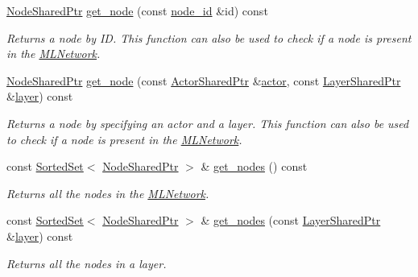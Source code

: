 \begin{DoxyCompactItemize}
\hyperlink{namespacemlnet_acf8b1b6deb52e7dacfc676c689f9a10c}{Node\+Shared\+Ptr} \hyperlink{classmlnet_1_1_m_l_network_abc3494cf0f75b871a619cee338bdf86f}{get\+\_\+node} (const \hyperlink{namespacemlnet_a4c354f08ca868982bf3ddae882ff71c6}{node\+\_\+id} \&id) const 
\begin{DoxyCompactList}\small\item\em Returns a node by I\+D. This function can also be used to check if a node is present in the \hyperlink{classmlnet_1_1_m_l_network}{M\+L\+Network}. \end{DoxyCompactList}\item 
\hyperlink{namespacemlnet_acf8b1b6deb52e7dacfc676c689f9a10c}{Node\+Shared\+Ptr} \hyperlink{classmlnet_1_1_m_l_network_af92d95a75d66e665cd689e9666f30206}{get\+\_\+node} (const \hyperlink{namespacemlnet_a714fd98ffaeaadd5c38d61fa53dc4d24}{Actor\+Shared\+Ptr} \&\hyperlink{classmlnet_1_1actor}{actor}, const \hyperlink{namespacemlnet_a10c007fb811c55339dd5b9d32bb0505d}{Layer\+Shared\+Ptr} \&\hyperlink{classmlnet_1_1layer}{layer}) const 
\begin{DoxyCompactList}\small\item\em Returns a node by specifying an actor and a layer. This function can also be used to check if a node is present in the \hyperlink{classmlnet_1_1_m_l_network}{M\+L\+Network}. \end{DoxyCompactList}\item 
const \hyperlink{classmlnet_1_1_sorted_set}{Sorted\+Set}$<$ \hyperlink{namespacemlnet_acf8b1b6deb52e7dacfc676c689f9a10c}{Node\+Shared\+Ptr} $>$ \& \hyperlink{classmlnet_1_1_m_l_network_afa99d24cafa9095887cb457c2a853924}{get\+\_\+nodes} () const 
\begin{DoxyCompactList}\small\item\em Returns all the nodes in the \hyperlink{classmlnet_1_1_m_l_network}{M\+L\+Network}. \end{DoxyCompactList}\item 
const \hyperlink{classmlnet_1_1_sorted_set}{Sorted\+Set}$<$ \hyperlink{namespacemlnet_acf8b1b6deb52e7dacfc676c689f9a10c}{Node\+Shared\+Ptr} $>$ \& \hyperlink{classmlnet_1_1_m_l_network_a19d12194812eafe8b3ab6c75ed13c1c2}{get\+\_\+nodes} (const \hyperlink{namespacemlnet_a10c007fb811c55339dd5b9d32bb0505d}{Layer\+Shared\+Ptr} \&\hyperlink{classmlnet_1_1layer}{layer}) const 
\begin{DoxyCompactList}\small\item\em Returns all the nodes in a layer. \end{DoxyCompactList}\item 

\end{DoxyCompactItemize}
